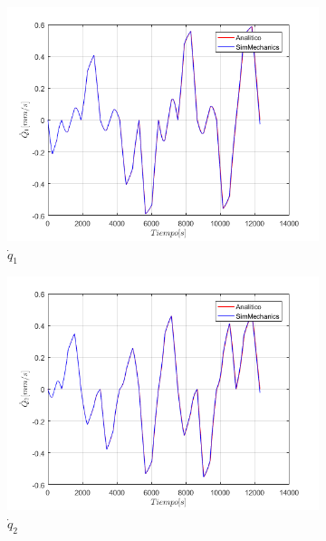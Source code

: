 \begin{figure}
    \centering
    \begin{subfigure}{0.45\textwidth}
        \includegraphics[width=\linewidth]{Cap4_DisenoBasico/Figura/ComparativoSimMechanics/Qpunto1.png}
        \caption{$\dot{q}_1$}
    \end{subfigure}
    \begin{subfigure}{0.45\textwidth}
        \includegraphics[width=\linewidth]{Cap4_DisenoBasico/Figura/ComparativoSimMechanics/Qpunto2.png}
        \caption{$\dot{q}_2$}
    \end{subfigure}
    \begin{subfigure}{0.45\textwidth}

\end{subfigure}
\end{figure}
